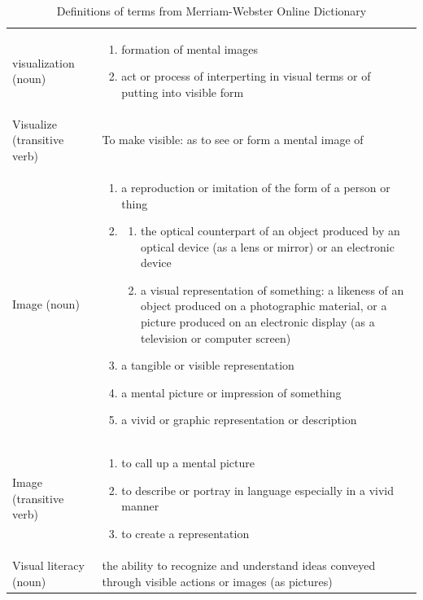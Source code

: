 \begin{table}[!htp]
\centering
\begin{tabular}{l p{10cm}}

visualization (noun) &

\begin{enumerate}[leftmargin=*]
\item formation of mental images
\item act or process of interperting in visual terms or of putting into visible form
\end{enumerate}
\\[4ex]


Visualize (transitive verb) &
To make visible: as to see or form a mental image of
\\[4ex]


Image (noun) &
\begin{enumerate}[leftmargin=*]
\item a reproduction or imitation of the form of a person or thing
\item
    \begin{enumerate}
    \item the optical counterpart of an object produced by an optical device (as a lens or mirror) or an electronic device
    \item a visual representation of something: a likeness of an object produced on a photographic material, or a picture produced on an electronic display (as a television or computer screen)
    \end{enumerate}
\item a tangible or visible representation
\item a mental picture or impression of something
\item a vivid or graphic representation or description
\end{enumerate}
\\[4ex]

Image (transitive verb) &
\begin{enumerate}[leftmargin=*]
\item to call up a mental picture
\item to describe or portray in language especially in a vivid manner
\item to create a representation
\end{enumerate}
\\[4ex]


Visual literacy (noun) &
the ability to recognize and understand ideas conveyed through visible actions or images (as pictures)

\end{tabular}
\caption[
Definitions of terms from Merriam-Webster Online Dictionary, Urldate: 07.2016
    \newline\small\texttt{\url{http://www.merriam-webster.com/}}
]{Definitions of terms from Merriam-Webster Online Dictionary}
\label{tab:meriam-dict}
\end{table}

